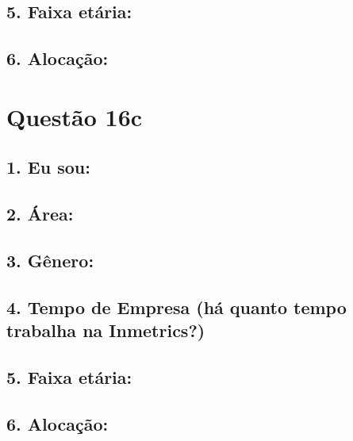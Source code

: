 \documentclass[]{book}
\begin{document}
\hypertarget{faixa-etaria-30}{%
\subsection{5. Faixa etária:}\label{faixa-etaria-30}}

\hypertarget{alocacao-30}{%
\subsection{6. Alocação:}\label{alocacao-30}}

\hypertarget{questao-16c}{%
\section{Questão 16c}\label{questao-16c}}

\hypertarget{eu-sou-31}{%
\subsection{1. Eu sou:}\label{eu-sou-31}}

\hypertarget{area-31}{%
\subsection{2. Área:}\label{area-31}}

\hypertarget{genero-31}{%
\subsection{3. Gênero:}\label{genero-31}}

\hypertarget{tempo-de-empresa-ha-quanto-tempo-trabalha-na-inmetrics-31}{%
\subsection{4. Tempo de Empresa (há quanto tempo trabalha na Inmetrics?)}\label{tempo-de-empresa-ha-quanto-tempo-trabalha-na-inmetrics-31}}

\hypertarget{faixa-etaria-31}{%
\subsection{5. Faixa etária:}\label{faixa-etaria-31}}

\hypertarget{alocacao-31}{%
\subsection{6. Alocação:}\label{alocacao-31}}
\end{document}
